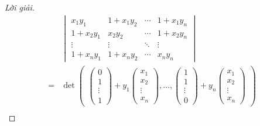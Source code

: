 \documentclass[class=nhvh-linear-algebra,crop=false]{standalone}
\begin{document}
\begin{proof}[Lời giải]
    \begingroup{}
    \allowdisplaybreaks{}
    \begin{align*}
          & \begin{vmatrix}
                x_{1}y_{1}     & 1 + x_{1}y_{2} & \cdots & 1 + x_{1}y_{n} \\
                1 + x_{2}y_{1} & x_{2}y_{2}     & \cdots & 1 + x_{2}y_{n} \\
                \vdots         & \vdots         & \ddots & \vdots         \\
                1 + x_{n}y_{1} & 1 + x_{n}y_{2} & \cdots & x_{n}y_{n}
            \end{vmatrix}                                                                                     \\
        = &
        \det\begin{pmatrix}
                \begin{pmatrix}
                0      \\
                1      \\
                \vdots \\
                1
            \end{pmatrix}
                +
                y_{1}\begin{pmatrix}
                     x_{1}  \\
                     x_{2}  \\
                     \vdots \\
                     x_{n}
                 \end{pmatrix},
                \ldots,
                \begin{pmatrix}
                1      \\
                1      \\
                \vdots \\
                0
            \end{pmatrix}
                +
                y_{n}\begin{pmatrix}
                     x_{1}  \\
                     x_{2}  \\
                     \vdots \\
                     x_{n}
                 \end{pmatrix}
            \end{pmatrix}                                                                                                              \\

\end{align*}
\end{proof}
\end{document}
